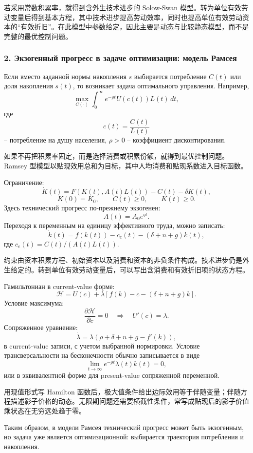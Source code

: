 \documentclass[12pt,a4paper]{article}
\newcommand{\zh}[1]{\par\noindent #1\par}
\begin{document}
\zh{若采用常数积累率，就得到含外生技术进步的 Solow-Swan 模型。转为单位有效劳动变量后得到基本方程，其中技术进步提高劳动效率，同时也提高单位有效劳动资本的“有效折旧”。在此模型中参数给定，因此主要是动态与比较静态模型，而不是完整的最优控制问题。}


\subsubsection*{2. Экзогенный прогресс в задаче оптимизации: модель Рамсея}
Если вместо заданной нормы накопления $s$ выбирается потребление $C(t)$ или доля накопления $s(t)$, то возникает задача оптимального управления. Например,
\[
\max_{C(\cdot)}\int_0^\infty e^{-\rho t}U(c(t))L(t)\,dt,
\]
где
\[
c(t)=\frac{C(t)}{L(t)}
\]
-- потребление на душу населения, $\rho>0$ -- коэффициент дисконтирования.

\zh{如果不再把积累率固定，而是选择消费或积累份额，就得到最优控制问题。Ramsey 型模型以贴现效用总和为目标，其中人均消费和贴现系数进入目标函数。}

Ограничение:
\[
\dot K(t)=F(K(t),A(t)L(t))-C(t)-\delta K(t),
\]
\[
K(0)=K_0,\qquad C(t)\ge 0,\qquad K(t)\ge 0.
\]
Здесь технический прогресс по-прежнему экзогенен:
\[
A(t)=A_0e^{gt}.
\]
Переходя к переменным на единицу эффективного труда, можно записать:
\[
\dot k(t)=f(k(t))-c_e(t)-(\delta+n+g)k(t),
\]
где $c_e(t)=C(t)/(A(t)L(t))$.

\zh{约束由资本积累方程、初始资本以及消费和资本的非负条件构成。技术进步仍是外生给定的。转到单位有效劳动变量后，可以写出含消费和有效折旧项的状态方程。}

Гамильтониан в current-value форме:
\[
\mathcal H=U(c)+\lambda\left[f(k)-c-(\delta+n+g)k\right].
\]
Условие максимума:
\[
\frac{\partial \mathcal H}{\partial c}=0
\quad\Longrightarrow\quad
U'(c)=\lambda.
\]
Сопряженное уравнение:
\[
\dot\lambda=\lambda\left(\rho+\delta+n+g-f'(k)\right),
\]
в current-value записи, с учетом выбранной нормировки. Условие трансверсальности на бесконечности обычно записывается в виде
\[
\lim_{t\to\infty}e^{-\rho t}\lambda(t)k(t)=0,
\]
или в эквивалентной форме для present-value сопряженной переменной.

\zh{用现值形式写 Hamilton 函数后，极大值条件给出边际效用等于伴随变量；伴随方程描述影子价格的动态。无限期问题还需要横截性条件，常写成贴现后的影子价值乘状态在无穷远处趋于零。}

Таким образом, в модели Рамсея технический прогресс может быть экзогенным, но задача уже является оптимизационной: выбирается траектория потребления и накопления.
\end{document}
